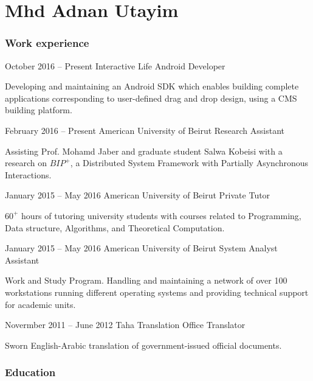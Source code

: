 \documentclass{tccv}
\begin{document}
\part{Mhd Adnan Utayim}

\section{Work experience}

\begin{eventlist}




\item{October 2016 -- Present}
     {Interactive Life}
     {Android Developer}

Developing and maintaining an Android SDK which enables building complete applications corresponding to user-defined drag and drop design, using a CMS building platform.


\item{February 2016 -- Present}
     {American University of Beirut}
     {Research Assistant}

Assisting Prof. Mohamd Jaber and graduate student Salwa Kobeisi with a research on $BIP^+$, a Distributed System Framework with Partially Asynchronous Interactions.

\item{January 2015 -- May 2016}
     {American University of Beirut}
     {Private Tutor}

$60^+$ hours of tutoring university students with courses related to Programming, Data structure, Algorithms, and Theoretical Computation.

\item{January 2015 -- May 2016}
     {American University of Beirut}
     {System Analyst Assistant}

Work and Study Program. Handling and maintaining a network of over 100 workstations running different operating systems and providing technical support for academic units.

\item{Novermber 2011 -- June 2012}
     {Taha Translation Office}
     {Translator}

Sworn English-Arabic translation of government-issued official documents.

\end{eventlist}


\section{Education}
\end{document}
